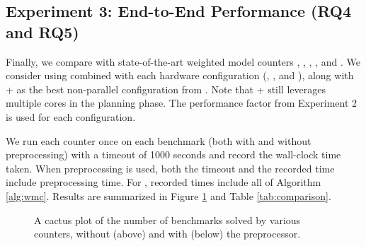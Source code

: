 
\subsection{Experiment 3: End-to-End Performance (RQ4 and RQ5)}
Finally, we compare  with state-of-the-art weighted model counters , , , , and . We consider  using  combined with each hardware configuration (, , and ), along with  +  as the best non-parallel configuration from \cite{DDV19}. Note that + still leverages multiple cores in the planning phase. The performance factor from Experiment 2 is used for each  configuration.

We run each counter once on each benchmark (both with and without  preprocessing) with a timeout of 1000 seconds and record the wall-clock time taken. When preprocessing is used, both the timeout and the recorded time include preprocessing time. For , recorded times include all of Algorithm \ref{alg:wmc}. Results are summarized in Figure \ref{fig:parallel:comparison} and Table \ref{tab:comparison}. 

\begin{figure}[t]
\begin{center}

%
\vspace*{-0.5cm}
\caption{\label{fig:parallel:comparison} A cactus plot of the number of benchmarks solved by various counters, without (above) and with (below) the   preprocessor.}
\end{center}
\vspace*{-0.8cm}
\end{figure}

